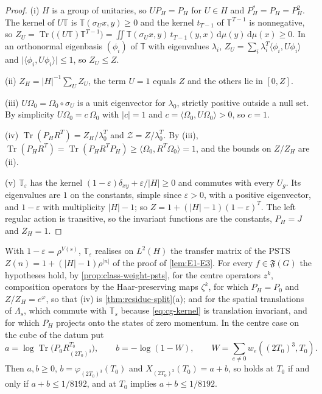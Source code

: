\documentclass[11pt,a4paper]{amsart}
\theoremstyle{definition}
\theoremstyle{remark}
\numberwithin{equation}{section}
\DeclareMathOperator{\Tr}{Tr}        %
\newcommand{\Fclass}{\mathfrak{F}}   %
\newcommand{\ip}[2]{\langle #1,#2\rangle}  %
\newcommand{\abs}[1]{\lvert #1\rvert}      %
\newcommand{\dd}{\,\mathrm{d}}             %
\newcommand{\PSTS}{\textup{PSTS}}          %
\newcommand{\TT}{\mathbb{T}}               %
\newcommand{\Zc}{\mathcal{Z}}              %
\newcommand{\XT}[2]{X_{#1}(#2)}            %
\newcommand{\Vol}[1]{V(#1)}                %
\newcommand{\cube}[1]{(2#1)^3}             %
\newcommand{\lzero}{\lambda_0}             %
\newcommand{\Omegazero}{\Omega_0}          %
\newcommand{\xconst}{\frac{1}{8192}}       %
\newcommand{\xconstinl}{1/8192}            %
\newcommand{\Mcirc}{\text{\upshape(M$^{\circ}$)}}   %
\newcommand{\Bcirc}{\text{\upshape(B$^{\circ}$)}}   %
\begin{document}
\begin{proof}
(i) $H$ is a group of unitaries, so $UP_H=P_H$ for $U\in H$ and $P_H^*=P_H=P_H^2$. The kernel of $U\TT$ is $\TT(\sigma_Ux,y)\ge0$ and the kernel $t_{T-1}$ of $\TT^{T-1}$ is nonnegative, so $Z_U=\Tr\bigl((U\TT)\TT^{T-1}\bigr)=\iint\TT(\sigma_Ux,y)\,t_{T-1}(y,x)\dd\mu(y)\dd\mu(x)\ge0$. In an orthonormal eigenbasis $(\phi_i)$ of $\TT$ with eigenvalues $\lambda_i$, $Z_U=\sum_i\lambda_i^T\ip{\phi_i}{U\phi_i}$ and $\abs{\ip{\phi_i}{U\phi_i}}\le1$, so $Z_U\le Z$.

(ii) $Z_H=\abs{H}^{-1}\sum_UZ_U$, the term $U=1$ equals $Z$ and the others lie in $[0,Z]$.

(iii) $U\Omegazero=\Omegazero\circ\sigma_U$ is a unit eigenvector for $\lzero$, strictly positive outside a null set. By simplicity $U\Omegazero=c\,\Omegazero$ with $\abs{c}=1$ and $c=\ip{\Omegazero}{U\Omegazero}>0$, so $c=1$.

(iv) $\Tr(P_HR^T)=Z_H/\lzero^T$ and $\Zc=Z/\lzero^T$. By (iii), $\Tr(P_HR^T)=\Tr(P_HR^TP_H)\ge\ip{\Omegazero}{R^T\Omegazero}=1$, and the bounds on $Z/Z_H$ are (ii).

(v) $\TT_\varepsilon$ has the kernel $(1-\varepsilon)\delta_{xy}+\varepsilon/\abs{H}\ge0$ and commutes with every $U_g$. Its eigenvalues are $1$ on the constants, simple since $\varepsilon>0$, with a positive eigenvector, and $1-\varepsilon$ with multiplicity $\abs{H}-1$; so $Z=1+(\abs{H}-1)(1-\varepsilon)^T$. The left regular action is transitive, so the invariant functions are the constants, $P_H=J$ and $Z_H=1$.
\end{proof}

With $1-\varepsilon=\rho^{\Vol{s}}$, $\TT_\varepsilon$ realises on $L^2(H)$ the transfer matrix of the \PSTS{} $Z(n)=1+(\abs{H}-1)\rho^{|n|}$ of the proof of \cref{lem:E1-E3}. For every $f\in\Fclass(G)$ the hypotheses hold, by \cref{prop:class-weight-psts}, for the centre operators $z^k$, composition operators by the Haar-preserving maps $\zeta^k$, for which $P_H=P_0$ and $Z/Z_H=e^{\varphi}$, so that (iv) is \cref{thm:residue-split}\textup{(a)}; and for the spatial translations of $\Lambda_s$, which commute with $\TT_s$ because \eqref{eq:cg-kernel} is translation invariant, and for which $P_H$ projects onto the states of zero momentum. In the centre case on the cube of the datum put
\begin{equation}\label{eq:cg-ab}
a=\log\Tr\bigl(P_0R_{\cube{T_0}}^{T_0}\bigr),\qquad b=-\log(1-W),\qquad W=\sum_{e\ne0}w_e(\cube{T_0},T_0).
\end{equation}
Then $a,b\ge0$, $b=\varphi_{\cube{T_0}}(T_0)$ and $\XT{\cube{T_0}}{T_0}=a+b$, so \Bcirc{} holds at $T_0$ if and only if $a+b\le\xconstinl$, and \Mcirc{} at $T_0$ implies $a+b\le\xconstinl$.
\end{document}

